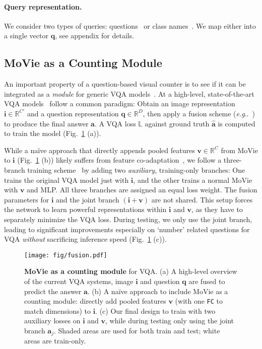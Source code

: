 \documentclass{article} \usepackage[dvipsnames,table]{xcolor}
\makeatletter
\def\rva{{\mathbf{a}}}
\def\rvi{{\mathbf{i}}}
\def\rvq{{\mathbf{q}}}
\def\rvv{{\mathbf{v}}}
\newcommand{\ours}[0]{MoVie\xspace}
\newcommand{\fc}{\texttt{FC}\xspace}
\DeclareRobustCommand\onedot{\futurelet\@let@token\@onedot}
\def\@onedot{\ifx\@let@token.\else.\null\fi\xspace}
\def\eg{\emph{e.g}\onedot} \def\Eg{\emph{E.g}\onedot}
\makeatother
\begin{document}
\paragraph{Query representation.} We consider two types of queries: questions~\cite{trott2018interpretable} or class names~\cite{chattopadhyay2017counting}. We map either into a single vector $\rvq$, see appendix for details.

\subsection{\ours as a Counting Module\label{sec:counter}}
An important property of a question-based visual counter is to see if it can be integrated as a \emph{module} for generic VQA models~\cite{zhang2018learning}. At a high-level, state-of-the-art VQA models~\cite{jiang2018pythia,yu2019deep} follow a common paradigm: Obtain an image representation $\rvi{\in}\mathbb{R}^{C'}$ and a question representation $\rvq{\in}\mathbb{R}^D$, then apply a fusion scheme (\eg~\cite{fukui2016multimodal}) to produce the final answer $\rva$. A VQA loss $\mathbb{L}$ against ground truth $\hat{\rva}$ is computed to train the model (Fig.~\ref{fig:fusion} (a)).

While a na\"{i}ve approach that directly appends pooled features $\rvv{\in}\mathbb{R}^{C}$ from \ours to $\rvi$ (Fig.~\ref{fig:fusion} (b)) likely suffers from feature co-adaptation~\cite{hinton2012improving}, we follow a three-branch training scheme~\cite{wang2019makes,qi2020imvotenet} by adding two \emph{auxiliary}, training-only branches: One trains the original VQA model just with $\rvi$, and the other trains a normal \ours with $\rvv$ and MLP. All three branches are assigned an equal loss weight. The fusion parameters for $\rvi$ and the joint branch $(\rvi{+}\rvv)$ are not shared. This setup forces the network to learn powerful representations within $\rvi$ and $\rvv$, as they have to separately minimize the VQA loss. During testing, we only use the joint branch, leading to significant improvements especially on `number' related questions for VQA \emph{without} sacrificing inference speed (Fig.~\ref{fig:fusion} (c)).

\begin{figure}[t]
\centering
\texttt{[image: fig/fusion.pdf]}
\caption{\label{fig:fusion}\textbf{\ours as a counting module} for VQA. (a) A high-level overview of the current VQA systems, image $\rvi$ and question $\rvq$ are fused to predict the answer $\rva$. (b) A na\"{i}ve approach to include \ours as a counting module: directly add pooled features $\rvv$ (with one \fc to match dimensions) to $\rvi$. (c) Our final design to train with two auxiliary losses on $\rvi$ and $\rvv$, while during testing only using the joint branch $\rva_j$. Shaded areas are used for both train and test; white areas are train-only.}
\end{figure}
\end{document}
